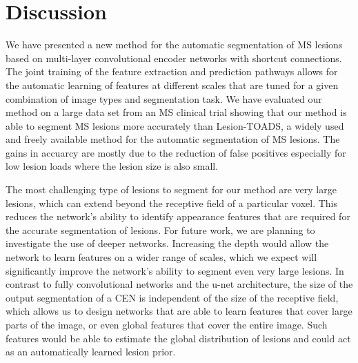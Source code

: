 \section{Discussion}


We have presented a new method for the automatic segmentation of MS lesions
based on multi-layer convolutional encoder networks with shortcut connections.
The joint training of the feature extraction and prediction pathways allows for
the automatic learning of features at different scales that are tuned for a
given combination of image types and segmentation task. We have evaluated our
method on a large data set from an MS clinical trial showing that our method is
able to segment MS lesions more accurately than Lesion-TOADS, a widely used and
freely available method for the automatic segmentation of MS lesions. The gains
in accuarcy are mostly due to the reduction of false positives especially for
low lesion loads where the lesion size is also small.

The most challenging type of lesions to segment for our method are very large
lesions, which can extend beyond the receptive field of a particular voxel. This
reduces the network's ability to identify appearance features that are required
for the accurate segmentation of lesions. For future work, we are planning to
investigate the use of deeper networks. Increasing the depth would allow the
network to learn features on a wider range of scales, which we expect will
significantly improve the network's ability to segment even very large lesions.
In contrast to fully convolutional networks and the u-net architecture, the size
of the output segmentation of a CEN is independent of the size of the receptive
field, which allows us to design networks that are able to learn features that cover
large parts of the image, or even global features that cover the entire image.
Such features would be able to estimate the global distribution of lesions and
could act as an automatically learned lesion prior.


